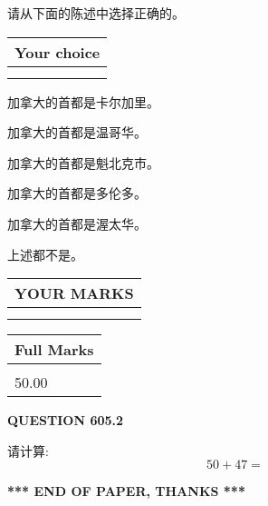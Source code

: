 \documentclass{ctexart}
\begin{document}
  
请从下面的陈述中选择正确的。
  
  
\noindent\hspace{3.0in} \begin{tabular}{|l|}
\hline
Your choice \\
\hline
 \\ 
 \\ 
\hline
\end{tabular}
  
  
 
 
加拿大的首都是卡尔加里。
 
 
加拿大的首都是温哥华。
 
 
加拿大的首都是魁北克市。
 
 
加拿大的首都是多伦多。
 
 
加拿大的首都是渥太华。
 
 
 上述都不是。
 
 
  
\vspace{0.2in}
  
\noindent\begin{tabular}{|l|}
\hline
 YOUR MARKS  \\
\hline
 \\ 
 \\ 
\hline
\end{tabular}
\hspace{0.05in} \begin{tabular}{|l|}
\hline
 Full Marks  \\
\hline
 \\ 
50.00 \\
\hline
\end{tabular}
{\textbf{\Large{QUESTION
605.2 
}}}
  
  
 
请计算:
\begin{equation}
50 +  %
47 = \nonumber
\end{equation}
 

 

 
   
   
 \vspace{0.2in}
 
   
   
   
   
\vspace{1.0in} 
{\textbf{\large{ *** END OF PAPER, THANKS *** }}} 
   
\end{document}
